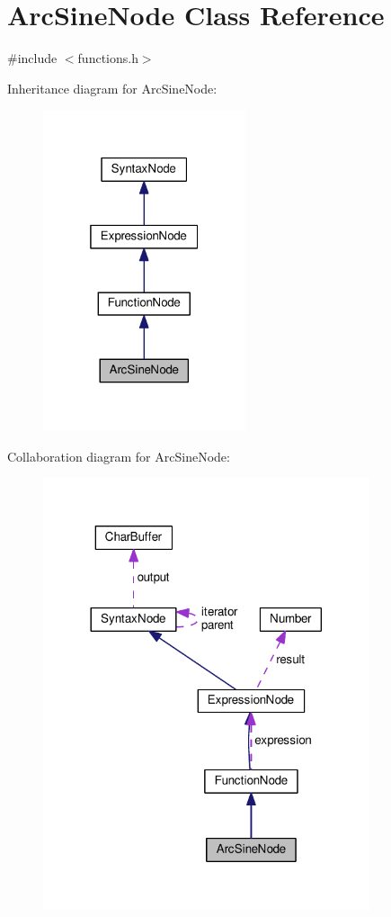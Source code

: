 \hypertarget{classArcSineNode}{}\section{Arc\+Sine\+Node Class Reference}
\label{classArcSineNode}


{\ttfamily \#include $<$functions.\+h$>$}



Inheritance diagram for Arc\+Sine\+Node\+:
\nopagebreak
\begin{figure}[H]
\begin{center}
\leavevmode
\includegraphics[width=169pt]{de/dd3/classArcSineNode__inherit__graph}
\end{center}
\end{figure}


Collaboration diagram for Arc\+Sine\+Node\+:
\nopagebreak
\begin{figure}[H]
\begin{center}
\leavevmode
\includegraphics[width=272pt]{d4/d5b/classArcSineNode__coll__graph}
\end{center}
\end{figure}
